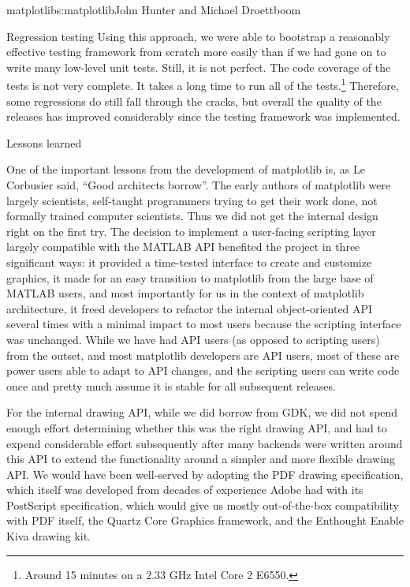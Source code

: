 \begin{aosachapter}{matplotlib}{s:matplotlib}{John Hunter and Michael Droettboom}
\begin{aosasect1}{Regression testing}
Using this approach, we were able to bootstrap a reasonably effective
testing framework from scratch more easily than if we had gone on to
write many low-level unit tests.  Still, it is not perfect.  The code
coverage of the tests is not very complete.  It takes a long time to
run all of the tests.\footnote{Around 15 minutes on a 2.33 GHz Intel
  Core 2 E6550.}  Therefore, some regressions do still fall through
the cracks, but overall the quality of the releases has improved
considerably since the testing framework was implemented.

\end{aosasect1}

\begin{aosasect1}{Lessons learned}

One of the important lessons from the development of matplotlib is,
as Le Corbusier said, ``Good architects borrow''.  The early authors
of matplotlib were largely scientists, self-taught programmers
trying to get their work done, not formally trained computer
scientists.  Thus we did not get the internal design right on the
first try.  The decision to implement a user-facing scripting layer
largely compatible with the MATLAB API benefited the project in
three significant ways: it provided a time-tested interface to
create and customize graphics, it made for an easy transition to
matplotlib from the large base of MATLAB users, and most importantly
for us in the context of matplotlib architecture, it freed
developers to refactor the internal object-oriented API several
times with a minimal impact to most users because the scripting
interface was unchanged.  While we have had API users (as opposed to
scripting users) from the outset, and most matplotlib developers are
API users, most of these are power users able to adapt to API
changes, and the scripting users can write code once and pretty much
assume it is stable for all subsequent releases.

For the internal drawing API, while we did borrow from GDK, we did not
spend enough effort determining whether this was the right drawing
API, and had to expend considerable effort subsequently after many
backends were written around this API to extend the functionality
around a simpler and more flexible drawing API.  We would have been
well-served by adopting the PDF drawing specification, which itself
was developed from decades of experience Adobe had with its PostScript
specification, which would give us mostly out-of-the-box compatibility
with PDF itself, the Quartz Core Graphics framework, and the Enthought
Enable Kiva drawing kit.


\end{aosasect1}
\end{aosachapter}
